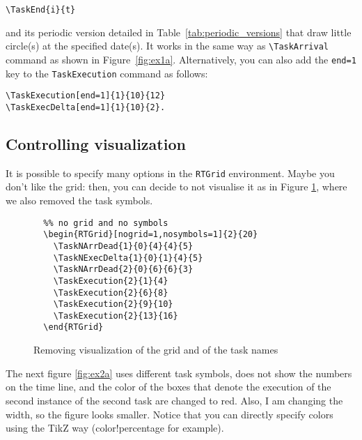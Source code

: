 \documentclass{article}
\begin{document}
\begin{verbatim}
\TaskEnd{i}{t}
\end{verbatim}

\noindent and its periodic version detailed in
Table~\ref{tab:periodic_versions} that draw little circle(s) at the
specified date(s). It works in the same way as \verb+\TaskArrival+
command as shown in Figure~\ref{fig:ex1a}. 
Alternatively, you can also add the \texttt{end=1} key to the
\texttt{TaskExecution} command as follows:

\begin{verbatim}
\TaskExecution[end=1]{1}{10}{12}
\TaskExecDelta[end=1]{1}{10}{2}.
\end{verbatim}


\subsection{Controlling visualization}

It is possible to specify many options in the \texttt{RTGrid}
environment. Maybe you don't like the grid: then, you can decide to
not visualise it as in Figure \ref{fig:ex2}, where we also removed the
task symbols.
\begin{figure}[!htbp]
  \centering
  \begin{RTGrid}[nogrid=1,nosymbols=1]{2}{20}
  \end{RTGrid}
\begin{verbatim}
  %% no grid and no symbols
  \begin{RTGrid}[nogrid=1,nosymbols=1]{2}{20}
    \TaskNArrDead{1}{0}{4}{4}{5}    
    \TaskNExecDelta{1}{0}{1}{4}{5}  
    \TaskNArrDead{2}{0}{6}{6}{3}
    \TaskExecution{2}{1}{4}
    \TaskExecution{2}{6}{8}
    \TaskExecution{2}{9}{10}
    \TaskExecution{2}{13}{16}        
  \end{RTGrid}
\end{verbatim}
  \caption{Removing visualization of the grid and of the task names}
  \label{fig:ex2}
\end{figure}

The next figure \ref{fig:ex2a} uses different task symbols, does not
show the numbers on the time line, and the color of the boxes that
denote the execution of the second instance of the second task are
changed to red. Also, I am changing the width, so the figure looks
smaller. Notice that you can directly specify colors using the TikZ
 way (color!percentage for example).
\end{document}
